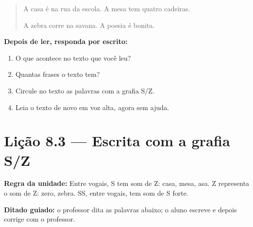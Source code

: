 \begin{quote}
A casa é na rua da escola. A mesa tem quatro cadeiras.

A zebra corre na savana. A poesia é bonita.
\end{quote}

\textbf{Depois de ler, responda por escrito:}
\begin{enumerate}

  \item O que acontece no texto que você leu?
  \begin{center}
  \underline{\hspace{12cm}}
  \end{center}

  \item Quantas frases o texto tem?
  \begin{center}
  \underline{\hspace{12cm}}
  \end{center}

  \item Circule no texto as palavras com a grafia S/Z.

  \item Leia o texto de novo em voz alta, agora sem ajuda.

\end{enumerate}

\section{Lição 8.3 --- Escrita com a grafia S/Z}

\noindent\textbf{Regra da unidade:} Entre vogais, S tem som de Z: casa, mesa, asa. Z representa o som de Z: zero, zebra. SS, entre vogais, tem som de S forte.


\noindent\textbf{Ditado guiado:} o professor dita as palavras abaixo; o aluno escreve e depois corrige com o professor.

\begin{center}
  \underline{\hspace{2.3cm}} \quad \underline{\hspace{2.3cm}} \quad \underline{\hspace{2.3cm}} \quad \underline{\hspace{2.3cm}}

  \underline{\hspace{2.3cm}} \quad \underline{\hspace{2.3cm}} \quad \underline{\hspace{2.3cm}} \quad \underline{\hspace{2.3cm}}
\end{center}


